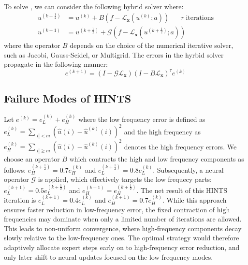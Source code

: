 \documentclass[12pt]{article}
\begin{document}
To solve , we can consider the following hybrid solver where:
\begin{align*}
    u^{\left(k + \frac{1}{2}\right)} &= u^{\left(k \right)} + B(f - \mathcal{L}_{\mathbf{x}}\left(u^{\left(k \right)}; a\right)) \quad \text{ $\tau$ iterations}\\
    u^{\left(k + 1\right)} &= u^{\left(k + \frac{1}{2}\right)} + \mathcal{G}\left(f - \mathcal{L}_{\mathbf{x}}\left(u^{\left(k + \frac{1}{2}\right)}; a\right)\right)
\end{align*}
where the operator $B$ depends on the choice of the numerical iterative solver, such as Jacobi, Gauss-Seidel, or Multigrid. The errors in the hyrbid solver propagate in the following manner:
\begin{equation}
    e^{(k+1)} = \left(I - \mathcal{G} \mathcal{L}_{\mathbf{x}}\right)\left(I - B \mathcal{L}_{\mathbf{x}}\right)^{\tau}e^{(k)} \label{eq:errorhybrid}
\end{equation}

\subsection{Failure Modes of HINTS}

Let $e^{(k)} = e^{(k)}_L + e^{(k)}_H$ where the low frequency error is defined as $e^{(k)}_L = \sum_{|i| < m} \left(\widehat{u}(i) - \widehat{u}^{(k)}(i)\right)^2$ and the high frequency as $e^{(k)}_H = \sum_{|i| \geq m} \left(\widehat{u}(i) - \widehat{u}^{(k)}(i)\right)^2$ denotes the high frequency errors. We choose an operator $B$ which contracts the high and low frequency components as follows: $e^{\left(k + \frac{1}{2}\right)}_H = 0.7e^{\left(k \right)}_H $ and $e^{\left(k + \frac{1}{2}\right)}_L = 0.8e^{\left(k \right)}_L $. Subsequently, a neural operator $\mathcal{G}$ is applied, which effectively targets the low frequecy parts: $e^{\left(k + 1\right)}_L = 0.5e^{\left(k + \frac{1}{2} \right)}_L $ and $e^{\left(k + 1\right)}_H = e^{\left(k + \frac{1}{2} \right)}_H $. The net result of this HINTS iteration is $e^{\left(k + 1\right)}_L = 0.4e^{\left(k  \right)}_L $ and $e^{\left(k + 1\right)}_H = 0.7e^{\left(k \right)}_H $.  While this approach ensures faster reduction in low-frequency error, the fixed contraction of high frequencies may dominate when only a limited number of iterations are allowed. This leads to non-uniform convergence, where high-frequency components decay slowly relative to the low-frequency ones. The optimal strategy would therefore adaptively allocate expert steps early on to high-frequency error reduction, and only later shift to neural updates focused on the low-frequency modes.
\end{document}
